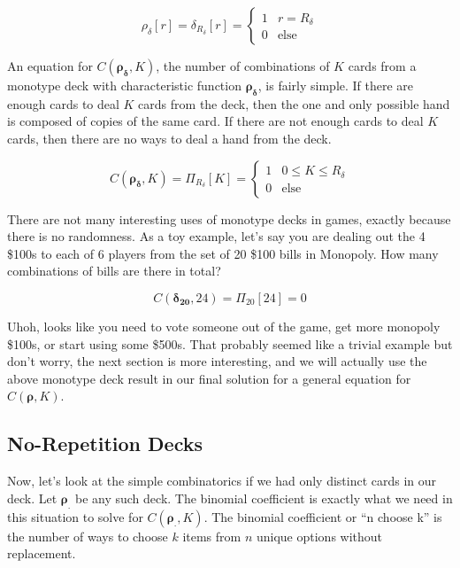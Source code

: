 \documentclass{article}
\begin{document}
\begin{equation}
    \rho_{\delta}[r] = \delta_{R_{\delta}}[r] = \begin{cases} 
      1 & r=R_{\delta} \\
      0 & \text{else}
   \end{cases}
\end{equation}

An equation for $C(\bm{\rho_{\delta}}, K)$, the number of combinations of $K$ cards from a monotype deck with characteristic function $\bm{\rho_{\delta}}$, is fairly simple. If there are enough cards to deal $K$ cards from the deck, then the one and only possible hand is composed of copies of the same card. If there are not enough cards to deal $K$ cards, then there are no ways to deal a hand from the deck.

\begin{equation}
    C(\bm{\rho_{\delta}}, K) = 
    \Pi_{R_{\delta}}[K] = \begin{cases} 
      1 & 0\leq K \leq R_{\delta} \\
      0 & \text{else}
   \end{cases}
\end{equation}

There are not many interesting uses of monotype decks in games, exactly because there is no randomness. As a toy example, let's say you are dealing out the 4 \$100s to each of 6 players from the set of 20 \$100 bills in Monopoly. How many combinations of bills are there in total?

\begin{equation}
    C(\bm{\delta_{20}}, 24) = \Pi_{20}[24] = 0
\end{equation}

Uhoh, looks like you need to vote someone out of the game, get more monopoly \$100s, or start using some \$500s. That probably seemed like a trivial example but don't worry, the next section is more interesting, and we will actually use the above monotype deck result in our final solution for a general equation for $C(\bm{\rho}, K)$.

\subsection{No-Repetition Decks}

Now, let's look at the simple combinatorics if we had only distinct cards in our deck. Let $\bm{\rho_{.}}$ be any such deck. The binomial coefficient is exactly what we need in this situation to solve for $C(\bm{\rho_.}, K)$. The binomial coefficient or ``n choose k'' is the number of ways to choose $k$ items from $n$ unique options without replacement.
\end{document}
